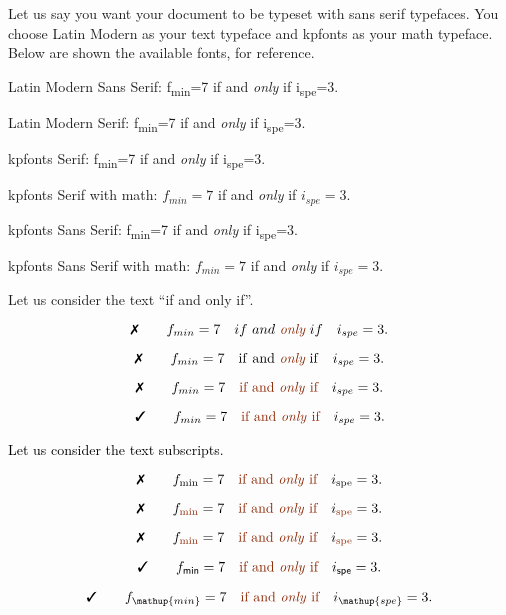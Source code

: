 \documentclass{article}
\begin{document}
Let us say you want your document to be typeset with sans serif typefaces. You choose Latin Modern as your text typeface and kpfonts as your math typeface. Below are shown the available fonts, for reference.

\smallskip{}

{\sffamily\color{lmcolour}
  Latin Modern Sans Serif:
  f\textsubscript{min}=7 if and \emph{only} if i\textsubscript{spe}=3.
}

{\rmfamily\color{lmcolour}
  Latin Modern Serif:
  f\textsubscript{min}=7 if and \emph{only} if i\textsubscript{spe}=3.
}

\smallskip{}

{\selectfont\color{kpcolour}
 kpfonts Serif: 
 f\textsubscript{min}=7 if and \emph{only} if i\textsubscript{spe}=3.
}

{\selectfont{}\color{kpcolour}
  kpfonts Serif with math:
  \(f_{min}=7\) if and \emph{only} if \(i_{spe}=3\).
}

{\selectfont\color{kpcolour}
  kpfonts Sans Serif:
  f\textsubscript{min}=7 if and \emph{only} if i\textsubscript{spe}=3.
}

{\selectfont{}\color{kpcolour}
  kpfonts Sans Serif with math:
  \(f_{min}=7\) if and \emph{only} if \(i_{spe}=3\).
}

\medskip{}

Let us consider the text \enquote{if and only if}.

\color{kpcolour}

\[\text{\color{black}\ding{55}}\qquad
  f_{min}=7\quad if~and~\emph{\color{lmcolour}only}~if \quad i_{spe}=3.
\]


\[\text{\color{black}\ding{55}}\qquad
  f_{min}=7\quad \mathrm{if~and~\emph{\color{lmcolour}only}~if} \quad i_{spe}=3.
\]

\[\text{\color{black}\ding{55}}\qquad
  f_{min}=7\quad \textrm{\color{lmcolour}if~and~\emph{only}~if} \quad i_{spe}=3.
\]


\[\text{\color{black}\ding{51}}\qquad
  f_{min}=7\quad \text{\color{lmcolour}if and \emph{only} if} \quad i_{spe}=3.
\]

\smallskip{}

\textcolor{black}{Let us consider the text subscripts.}

\[\text{\color{black}\ding{55}}\qquad
  f_{\mathrm{min}}=7\quad \text{\color{lmcolour}if and \emph{only} if} \quad i_{\mathrm{spe}}=3.
\]

\[\text{\color{black}\ding{55}}\qquad
  f_{\textrm{\color{lmcolour}min}}=7\quad \text{\color{lmcolour}if and \emph{only} if} \quad i_{\textrm{\color{lmcolour}spe}}=3.
\]

\[\text{\color{black}\ding{55}}\qquad
  f_{\text{\color{lmcolour}min}}=7\quad \text{\color{lmcolour}if and \emph{only} if} \quad i_{\text{\color{lmcolour}spe}}=3.
\]

\[\text{\color{black}\ding{51}}\qquad
  f_{\mathsf{min}}=7\quad \text{\color{lmcolour}if and \emph{only} if} \quad i_{\mathsf{spe}}=3.
\]

\[\text{\color{black}\ding{51}}\qquad
  f_{\mathup{min}}=7\quad \text{\color{lmcolour}if and \emph{only} if} \quad i_{\mathup{spe}}=3.
\]
\end{document}
